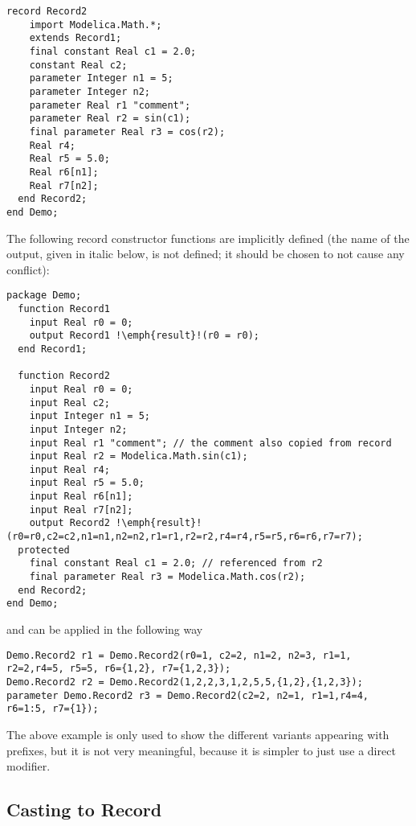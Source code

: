 \begin{nonnormative}
\begin{lstlisting}[language=modelica]
  record Record2
    import Modelica.Math.*;
    extends Record1;
    final constant Real c1 = 2.0;
    constant Real c2;
    parameter Integer n1 = 5;
    parameter Integer n2;
    parameter Real r1 "comment";
    parameter Real r2 = sin(c1);
    final parameter Real r3 = cos(r2);
    Real r4;
    Real r5 = 5.0;
    Real r6[n1];
    Real r7[n2];
  end Record2;
end Demo;
\end{lstlisting}

The following record constructor functions are implicitly defined
(the name of the output, given in italic below, is not defined; it
should be chosen to not cause any conflict):
\begin{lstlisting}[language=modelica,escapechar=!]
package Demo;
  function Record1
    input Real r0 = 0;
    output Record1 !\emph{result}!(r0 = r0);
  end Record1;

  function Record2
    input Real r0 = 0;
    input Real c2;
    input Integer n1 = 5;
    input Integer n2;
    input Real r1 "comment"; // the comment also copied from record
    input Real r2 = Modelica.Math.sin(c1);
    input Real r4;
    input Real r5 = 5.0;
    input Real r6[n1];
    input Real r7[n2];
    output Record2 !\emph{result}!(r0=r0,c2=c2,n1=n1,n2=n2,r1=r1,r2=r2,r4=r4,r5=r5,r6=r6,r7=r7);
  protected
    final constant Real c1 = 2.0; // referenced from r2
    final parameter Real r3 = Modelica.Math.cos(r2);
  end Record2;
end Demo;
\end{lstlisting}
and can be applied in the following way
\begin{lstlisting}[language=modelica]
Demo.Record2 r1 = Demo.Record2(r0=1, c2=2, n1=2, n2=3, r1=1, r2=2,r4=5, r5=5, r6={1,2}, r7={1,2,3});
Demo.Record2 r2 = Demo.Record2(1,2,2,3,1,2,5,5,{1,2},{1,2,3});
parameter Demo.Record2 r3 = Demo.Record2(c2=2, n2=1, r1=1,r4=4, r6=1:5, r7={1});
\end{lstlisting}

The above example is only used to show the different variants
appearing with prefixes, but it is not very meaningful, because it is
simpler to just use a direct modifier.
\end{nonnormative}

\subsection{Casting to Record}\label{casting-to-record}

